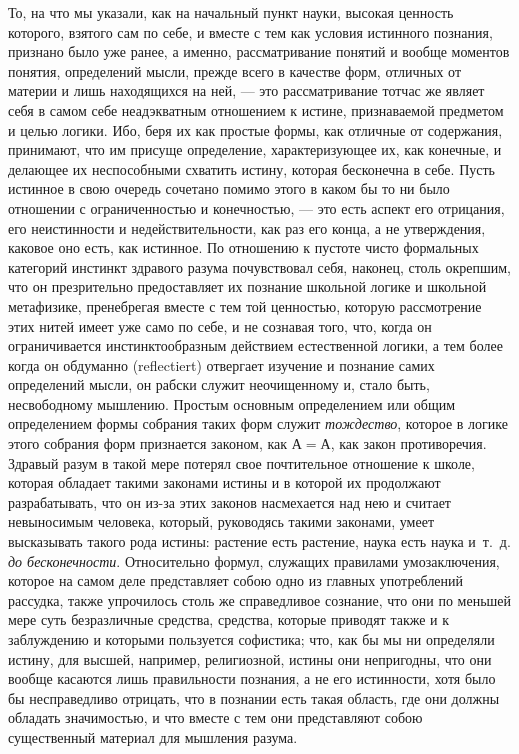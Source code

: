 То, на что мы указали, как на начальный пункт науки, высокая ценность
которого, взятого сам по себе, и вместе с тем как условия истинного
познания, признано было уже ранее, а именно, рассматривание понятий и
вообще моментов понятия, определений мысли, прежде всего в качестве форм,
отличных от материи и лишь находящихся на ней, — это рассматривание тотчас
же являет себя в самом себе неадэкватным отношением к истине, признаваемой
предметом и целью логики. Ибо, беря их как простые формы, как отличные от
содержания, принимают, что им присуще определение, характеризующее их, как
конечные, и делающее их неспособными схватить истину, которая бесконечна в
себе. Пусть истинное в свою очередь сочетано помимо этого в каком бы то ни
было отношении с ограниченностью и конечностью, — это есть аспект его
отрицания, его неистинности и недействительности, как раз его конца, а не
утверждения, каковое оно есть, как истинное. По отношению к пустоте чисто
формальных категорий инстинкт здравого разума почувствовал себя, наконец,
столь окрепшим, что он презрительно предоставляет их познание школьной
логике и школьной метафизике, пренебрегая вместе с тем той ценностью,
которую рассмотрение этих нитей имеет уже само по себе, и не сознавая того,
что, когда он ограничивается инстинктообразным действием естественной
логики, а тем более когда он обдуманно (reflectiert) отвергает изучение и
познание самих определений мысли, он рабски служит неочищенному и, стало
быть, несвободному мышлению. Простым основным определением или общим
определением формы собрания таких форм служит
{\em тождество}, которое в логике этого собрания форм
признается законом, как $А=А$, как закон противоречия. Здравый разум
в такой мере потерял свое почтительное отношение к школе, которая обладает
такими законами истины и в которой их продолжают разрабатывать, что он
из-за этих законов насмехается над нею и считает невыносимым человека,
который, руководясь такими законами, умеет высказывать такого рода истины:
растение есть растение, наука есть наука и~т.~д.{\em 
до бесконечности}. Относительно формул, служащих правилами умозаключения,
которое на самом деле представляет собою одно из главных употреблений
рассудка, также упрочилось столь же справедливое сознание, что они по
меньшей мере суть безразличные средства, средства, которые приводят также и
к заблуждению и которыми пользуется софистика; что, как бы мы ни определяли
истину, для высшей, например, религиозной, истины они непригодны, что они
вообще касаются лишь правильности познания, а не его истинности, хотя было
бы несправедливо отрицать, что в познании есть такая область, где они
должны обладать значимостью, и что вместе с тем они представляют собою
существенный материал для мышления разума.

